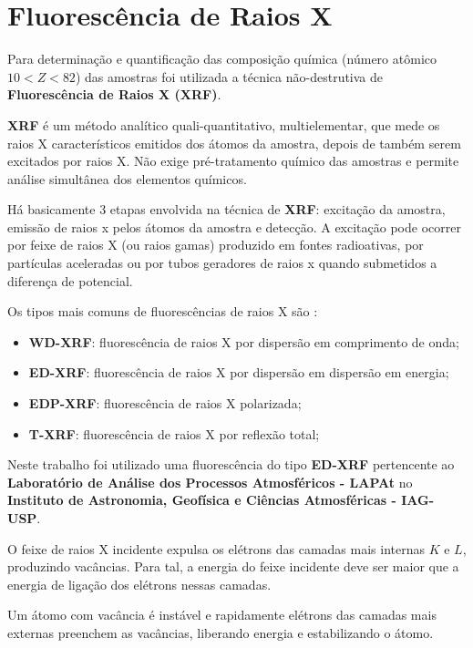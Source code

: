 \section{Fluorescência de Raios X}

Para determinação e quantificação das composição química (número atômico 
$ 10 < Z < 82$) das amostras foi utilizada a técnica não-destrutiva de 
\textbf{Fluorescência de Raios X (XRF)}.

\textbf{XRF} é um método analítico quali-quantitativo, 
multielementar, que mede os raios X característicos emitidos dos átomos da amostra, 
depois de também serem excitados por raios X. Não exige pré-tratamento químico
das amostras e permite análise simultânea dos elementos químicos.

Há basicamente 3 etapas envolvida na técnica de \textbf{XRF}:
excitação da amostra, emissão de raios x pelos átomos da amostra
e detecção. A excitação pode ocorrer por feixe de raios X (ou raios gamas) 
produzido em fontes radioativas, por partículas aceleradas ou 
por tubos geradores de raios x quando submetidos a diferença de potencial. 

Os tipos mais comuns de fluorescências de raios X são \citep{jenkins1988}:

\begin{itemize}
  \item \textbf{WD-XRF}: fluorescência de raios X por dispersão em comprimento de onda;
  \item \textbf{ED-XRF}: fluorescência de raios X por dispersão em dispersão em energia;
  \item \textbf{EDP-XRF}: fluorescência de raios X polarizada;
  \item \textbf{T-XRF}: fluorescência de raios X por reflexão total;
\end{itemize}

Neste trabalho foi utilizado uma fluorescência do tipo \textbf{ED-XRF}
pertencente ao \textbf{Laboratório de Análise dos Processos Atmosféricos - LAPAt}
no \textbf{Instituto de Astronomia, Geofísica e Ciências Atmosféricas - IAG-USP}.

O feixe de raios X incidente expulsa os elétrons das camadas mais 
internas $K$ e $L$, produzindo vacâncias. Para tal, a energia do feixe
incidente deve ser maior que a energia de ligação dos elétrons nessas camadas. 

Um átomo com vacância é instável e rapidamente elétrons das camadas 
mais externas preenchem as vacâncias, liberando energia e estabilizando o átomo.  

